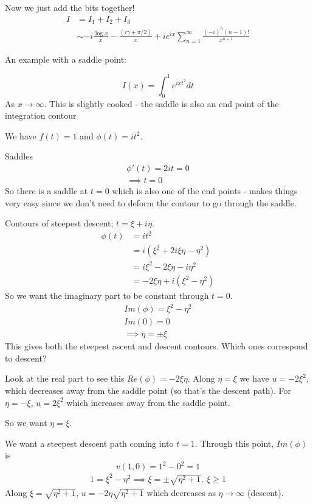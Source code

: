 \documentclass{X:/Documents/Coding/Latex/myassignment}
\begin{document}
Now we just add the bits together!
\begin{align*}
    I &= I_1 + I_2 + I_3\\
    &\sim -i\frac{\log x}{x} - \frac{(i\gamma + \pi/2)}{x} + ie^{ix} \sum_{n=1}^\infty \frac{(-i)^n (n-1)!}{x^{n+1}}
\end{align*}



An example with a saddle point:

\[I(x) = \int_0^1 e^{ixt^2}dt\]
As $x\to\infty$. This is slightly cooked - the saddle is also an end point of the integration contour

We have $f(t) =1$ and $\phi(t) = it^2$.

Saddles
\begin{align*}
    \phi'(t) = 2it= 0\\
    \implies t=0
\end{align*}
So there is a saddle at $t=0$ which is also one of the end points - makes things very easy since we don't need to deform the contour to go through the saddle.

Contours of steepest descent; $t=\xi + i\eta$. 
\begin{align*}
    \phi(t) &= it^2\\
    &=i\left(\xi^2 +2i\xi \eta -\eta^2\right)\\
    &= i\xi^2 - 2\xi \eta - i\eta^2\\
    &= -2\xi\eta + i(\xi^2-\eta^2)
\end{align*}
So we want the imaginary part to be constant through $t=0$.
\begin{align*}
    Im(\phi) = \xi^2 -\eta^2\\
    Im(0) = 0 \\
    \implies \eta = \pm \xi
\end{align*}
This gives both the steepest ascent and descent contours. Which ones correspond to descent?

Look at the real part to see this $Re(\phi) = -2\xi\eta$. Along $\eta = \xi$ we have $u=-2\xi^2$, which decreases away from the saddle point (so that's the descent path). For $\eta = -\xi$, $u = 2\xi^2$ which increases away from the saddle point.

So we want $\eta = \xi$.


We want a steepest descent path coming into $t=1$. Through this point, $Im(\phi)$ is
\[v(1,0) = 1^2-0^2 = 1\]
\begin{align*}
    1 = \xi^2 - \eta^2 \implies \xi = \pm \sqrt{\eta^2 + 1}, \ \xi \geq 1
\end{align*}
Along $\xi = \sqrt{\eta^2 + 1}$, $u= -2\eta \sqrt{\eta^2 + 1}$ which decreases as $\eta \to \infty$ (descent).
\end{document}
